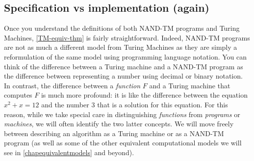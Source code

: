 \subsection{Specification vs implementation
(again)}\label{Specification-vs-implemen}

Once you understand the definitions of both NAND-TM programs and Turing
Machines, \cref{TM-equiv-thm} is fairly straightforward. Indeed, NAND-TM
programs are not as much a different model from Turing Machines as they
are simply a reformulation of the same model using programming language
notation. You can think of the difference between a Turing machine and a
NAND-TM program as the difference between representing a number using
decimal or binary notation. In contrast, the difference between a
\emph{function} \(F\) and a Turing machine that computes \(F\) is much
more profound: it is like the difference between the equation
\(x^2 + x = 12\) and the number \(3\) that is a solution for this
equation. For this reason, while we take special care in distinguishing
\emph{functions} from \emph{programs} or \emph{machines}, we will often
identify the two latter concepts. We will move freely between describing
an algorithm as a Turing machine or as a NAND-TM program (as well as
some of the other equivalent computational models we will see in
\cref{chapequivalentmodels} and beyond).

